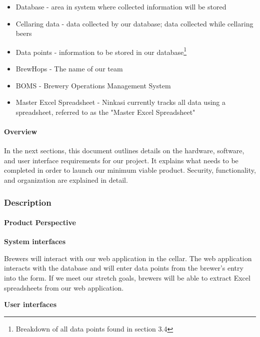     \begin{itemize}
      \item Database - area in system where collected information will be stored
      \item Cellaring data - data collected by our database; data collected while cellaring beers
      \item Data points - information to be stored in our database\footnote{Breakdown of all data points found in section 3.4}
      \item BrewHops - The name of our team
      \item BOMS - Brewery Operations Management System
      \item Master Excel Spreadsheet - Ninkasi currently tracks all data using a spreadsheet, referred to as the "Master Excel Spreadsheet"
    \end{itemize}

	\paragraph{Overview}
		In the next sections, this document outlines details on the hardware, software, and user interface requirements for our project.
		It explains what needs to be completed in order to launch our minimum viable product.
		Security, functionality, and organization are explained in detail.

\subsubsection{Description}
	\paragraph{Product Perspective}
		\textbf{System interfaces}

			Brewers will interact with our web application in the cellar.
			The web application interacts with the database and will enter data points from the brewer's entry into the form.
			If we meet our stretch goals, brewers will be able to extract Excel spreadsheets from our web application.

		\textbf{User interfaces}

